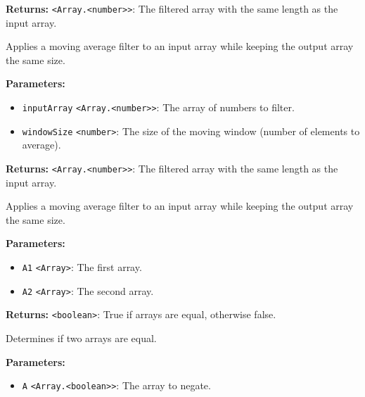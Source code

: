 \documentclass[12pt,a4paper]{article}
\begin{document}
\noindent \textbf{Returns:} \texttt{<Array.<number>>}: The filtered array with the same length as the input array.

\noindent Applies a moving average filter to an input array while keeping the output array the same size.

\vspace{5mm}
\noindent {}


\noindent \textbf{Parameters:}
\begin{itemize}
  \item \texttt{inputArray} \texttt{<Array.<number>>}: The array of numbers to filter.
  \item \texttt{windowSize} \texttt{<number>}: The size of the moving window (number of elements to average).
\end{itemize}

\noindent \textbf{Returns:} \texttt{<Array.<number>>}: The filtered array with the same length as the input array.

\noindent Applies a moving average filter to an input array while keeping the output array the same size.

\vspace{5mm}
\noindent {}


\noindent \textbf{Parameters:}
\begin{itemize}
  \item \texttt{A1} \texttt{<Array>}: The first array.
  \item \texttt{A2} \texttt{<Array>}: The second array.
\end{itemize}

\noindent \textbf{Returns:} \texttt{<boolean>}: True if arrays are equal, otherwise false.

\noindent Determines if two arrays are equal.

\vspace{5mm}
\noindent {}


\noindent \textbf{Parameters:}
\begin{itemize}
  \item \texttt{A} \texttt{<Array.<boolean>>}: The array to negate.
\end{itemize}
\end{document}
